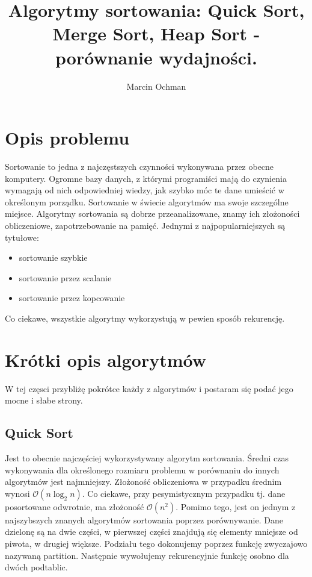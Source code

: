 \documentclass[10pt,a4paper]{article}
\author{Marcin Ochman}
\title{Algorytmy sortowania: Quick Sort, Merge Sort, Heap Sort - porównanie wydajności. }
\begin{document}
\maketitle
\section{Opis problemu}

Sortowanie to jedna z najczęstszych czynności wykonywana przez obecne komputery.
Ogromne bazy danych, z którymi programiści mają do czynienia wymagają od nich
odpowiedniej wiedzy, jak szybko móc te dane umieścić w określonym porządku.
Sortowanie w świecie algorytmów ma swoje szczególne miejsce. Algorytmy sortowania są
dobrze przeanalizowane, znamy ich złożoności obliczeniowe, zapotrzebowanie na pamięć.
Jednymi z najpopularniejszych są tytułowe:
\begin{itemize}
	\item sortowanie szybkie
	\item sortowanie przez scalanie
	\item sortowanie przez kopcowanie
\end{itemize}
Co ciekawe, wszystkie algorytmy wykorzystują w pewien sposób rekurencję.


\section{Krótki opis algorytmów}

W tej częsci przybliżę pokrótce każdy z algorytmów i postaram się podać jego mocne i
słabe strony.

\subsection{Quick Sort}

Jest to obecnie najczęściej wykorzystywany algorytm sortowania. Średni czas wykonywania
dla określonego rozmiaru problemu w porównaniu do innych algorytmów jest najmniejszy.
Złożoność obliczeniowa w przypadku średnim wynosi $\mathcal{O}(n\log_2 n)$.
Co ciekawe, przy pesymistycznym przypadku tj. dane posortowane odwrotnie, ma
złożoność $\mathcal{O}(n^2)$. Pomimo tego, jest on jednym z najszybszych znanych 
algorytmów sortowania poprzez porównywanie. Dane dzielonę są na dwie części, 
w pierwszej części znajdują się elementy mniejsze od piwota, w drugiej większe. 
Podziału tego dokonujemy poprzez funkcję zwyczajowo nazywaną partition. Następnie
wywołujemy rekurencyjnie funkcję osobno dla dwóch podtablic.
\end{document}
